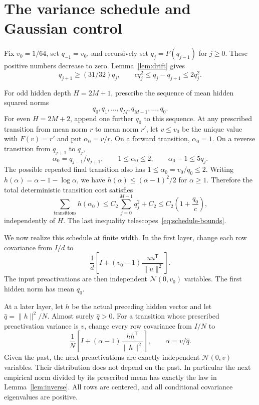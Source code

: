 \documentclass[11pt]{article}
\begin{document}
\section{The variance schedule and Gaussian control}
Fix $v_0=1/64$, set $q_{-1}=v_0$, and recursively set
$q_j=F(q_{j-1})$ for $j\ge0$. These positive numbers decrease to zero. Lemma~\ref{lem:drift} gives
\begin{equation}
 q_{j+1}\ge(31/32)q_j,\qquad
 cq_j^2\le q_j-q_{j+1}\le2q_j^2.
 \label{eq:schedule-bounds}
\end{equation}

For odd hidden depth $H=2M+1$, prescribe the sequence of mean hidden squared norms
\[
 q_0,q_1,\ldots,q_M,q_{M-1},\ldots,q_0.
\]
For even $H=2M+2$, append one further $q_0$ to this sequence. At any prescribed transition from mean norm $r$ to mean norm $r'$, let $v\le v_0$ be the unique value with $F(v)=r'$ and put $\alpha_0=v/r$.
On a forward transition, $\alpha_0=1$. On a reverse transition from $q_{j+1}$ to $q_j$,
\[
 \alpha_0=q_{j-1}/q_{j+1},\qquad 1\le\alpha_0\le2,
 \qquad \alpha_0-1\le5q_j.
\]
The possible repeated final transition also has $1\le\alpha_0=v_0/q_0\le2$.
Writing $h(\alpha)=\alpha-1-\log\alpha$, we have
$h(\alpha)\le(\alpha-1)^2/2$ for $\alpha\ge1$. Therefore the total deterministic transition cost satisfies
\begin{equation}
 \sum_{\text{transitions}} h(\alpha_0)
 \le C_2\sum_{j=0}^{M-1}q_j^2+C_2
 \le C_2\left(1+\frac{q_0}{c}\right),
 \label{eq:finite-action}
\end{equation}
independently of $H$. The last inequality telescopes~\eqref{eq:schedule-bounds}.

We now realize this schedule at finite width. In the first layer, change each row covariance from $I/d$ to
\[
 \frac1d\left[I+(v_0-1)\frac{uu^{\mathsf T}}{\|u\|^2}\right].
\]
The input preactivations are then independent $\mathcal N(0,v_0)$ variables. The first hidden norm has mean $q_0$.

At a later layer, let $h$ be the actual preceding hidden vector and let
$\widehat q=\|h\|^2/N$. Almost surely $\widehat q>0$. For a transition whose prescribed preactivation variance is $v$, change every row covariance from $I/N$ to
\begin{equation}
 \frac1N\left[I+(\alpha-1)\frac{hh^{\mathsf T}}{\|h\|^2}\right],
 \qquad \alpha=v/\widehat q.
 \label{eq:control}
\end{equation}
Given the past, the next preactivations are exactly independent $\mathcal N(0,v)$ variables. Their distribution does not depend on the past. In particular the next empirical norm divided by its prescribed mean has exactly the law in Lemma~\ref{lem:inverse}. All rows are centered, and all conditional covariance eigenvalues are positive.
\end{document}

